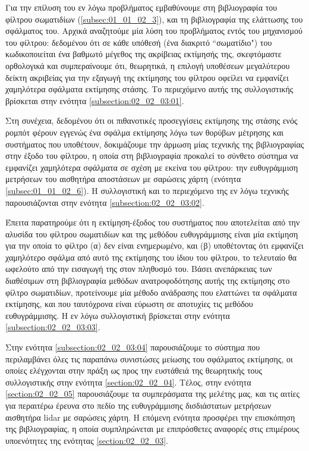 Για την επίλυση του εν λόγω προβλήματος εμβαθύνουμε στη βιβλιογραφία του
φίλτρου σωματιδίων (\ref{subsec:01_01_02_3}), και τη βιβλιογραφία της ελάττωσης
του σφάλματος του. Αρχικά αναζητούμε μία λύση του προβλήματος εντός του
μηχανισμού του φίλτρου: δεδομένου ότι σε κάθε υπόθεσή (ένα διακριτό
``σωματίδιο") του κωδικοποιείται ένα βαθμωτό μέγεθος της ακρίβειας εκτίμησής
της, σκεφτόμαστε ορθολογικά και συμπεραίνουμε ότι, θεωρητικά, η επιλογή
υποθέσεων μεγαλύτερου δείκτη ακριβείας για την εξαγωγή της εκτίμησης του
φίλτρου οφείλει να εμφανίζει χαμηλότερα σφάλματα εκτίμησης στάσης. Το
περιεχόμενο αυτής της συλλογιστικής βρίσκεται στην ενότητα
\ref{subsection:02_02_03:01}.

Στη συνέχεια, δεδομένου ότι οι πιθανοτικές προσεγγίσεις εκτίμησης της στάσης
ενός ρομπότ φέρουν εγγενώς ένα σφάλμα εκτίμησης λόγω των θορύβων μέτρησης και
συστήματος που υποθέτουν, δοκιμάζουμε την άρμωση μίας τεχνικής της
βιβλιογραφίας στην έξοδο του φίλτρου, η οποία στη βιβλιογραφία προκαλεί το
σύνθετο σύστημα να εμφανίζει χαμηλότερα σφάλματα σε σχέση με εκείνα του
φίλτρου: την ευθυγράμμιση μετρήσεων του αισθητήρα αποστάσεων με σαρώσεις χάρτη
(ενότητα \ref{subsec:01_01_02_6}). Η συλλογιστική και το περιεχόμενο της εν
λόγω τεχνικής παρουσιάζονται στην ενότητα \ref{subsection:02_02_03:02}.

Έπειτα παρατηρούμε ότι η εκτίμηση-έξοδος του συστήματος που αποτελείται από την
αλυσίδα του φίλτρου σωματιδίων και της μεθόδου ευθυγράμμισης είναι μία εκτίμηση
για την οποία το φίλτρο (α) δεν είναι ενημερωμένο, και (β) υποθέτοντας ότι
εμφανίζει χαμηλότερο σφάλμα από αυτό της εκτίμησης του ίδιου του φίλτρου, το
τελευταίο θα ωφελούτο από την εισαγωγή της στον πληθυσμό του. Βάσει ανεπάρκειας
των διαθέσιμων στη βιβλιογραφία μεθόδων ανατροφοδότησης αυτής της εκτίμησης στο
φίλτρο σωματιδίων, προτείνουμε μία μέθοδο ανάδρασης που ελαττώνει τα σφάλματα
εκτίμησης, και που ταυτόχρονα είναι εύρωστη σε αποτυχίες τις μεθόδου
ευθυγράμμισης.  Η εν λόγω συλλογιστική βρίσκεται στην ενότητα
\ref{subsection:02_02_03:03}.

Στην ενότητα \ref{subsection:02_02_03:04} παρουσιάζουμε το σύστημα που
περιλαμβάνει όλες τις παραπάνω συνιστώσες μείωσης του σφάλματος εκτίμησης, οι
οποίες ελέγχονται στην πράξη ως προς την ευστάθειά της θεωρητικής τους
συλλογιστικής στην ενότητα \ref{section:02_02_04}. Τέλος, στην ενότητα
\ref{section:02_02_05} παρουσιάζουμε τα συμπεράσματα της μελέτης μας, και τις
αιτίες για περαιτέρω έρευνα στο πεδίο της ευθυγράμμισης δισδιάστατων μετρήσεων
αισθητήρα lidar με σαρώσεις χάρτη. Η επόμενη ενότητα προσφέρει την επισκόπηση
της βιβλιογραφίας, η οποία συμπληρώνεται με επιπρόσθετες αναφορές στις
επιμέρους υποενότητες της ενότητας \ref{section:02_02_03}.
